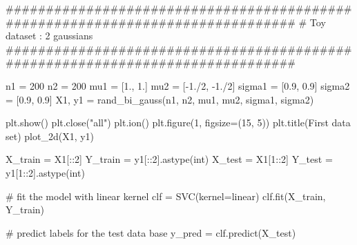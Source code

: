 \documentclass[
  12pt,
  letterpaper,
  DIV=11,
  numbers=noendperiod]{scrartcl}
\newenvironment{Shaded}{\begin{snugshade}}{\end{snugshade}}
\newcommand{\BuiltInTok}[1]{\textcolor[rgb]{0.00,0.23,0.31}{#1}}
\newcommand{\CommentTok}[1]{\textcolor[rgb]{0.37,0.37,0.37}{#1}}
\newcommand{\DecValTok}[1]{\textcolor[rgb]{0.68,0.00,0.00}{#1}}
\newcommand{\FloatTok}[1]{\textcolor[rgb]{0.68,0.00,0.00}{#1}}
\newcommand{\NormalTok}[1]{\textcolor[rgb]{0.00,0.23,0.31}{#1}}
\newcommand{\OperatorTok}[1]{\textcolor[rgb]{0.37,0.37,0.37}{#1}}
\newcommand{\StringTok}[1]{\textcolor[rgb]{0.13,0.47,0.30}{#1}}
\begin{document}
\begin{Shaded}
\begin{Highlighting}[]
\CommentTok{\#\#\#\#\#\#\#\#\#\#\#\#\#\#\#\#\#\#\#\#\#\#\#\#\#\#\#\#\#\#\#\#\#\#\#\#\#\#\#\#\#\#\#\#\#\#\#\#\#\#\#\#\#\#\#\#\#\#\#\#\#\#\#\#\#\#\#\#\#\#\#\#\#\#\#\#\#\#\#}
\CommentTok{\#               Toy dataset : 2 gaussians}
\CommentTok{\#\#\#\#\#\#\#\#\#\#\#\#\#\#\#\#\#\#\#\#\#\#\#\#\#\#\#\#\#\#\#\#\#\#\#\#\#\#\#\#\#\#\#\#\#\#\#\#\#\#\#\#\#\#\#\#\#\#\#\#\#\#\#\#\#\#\#\#\#\#\#\#\#\#\#\#\#\#\#}

\NormalTok{n1 }\OperatorTok{=} \DecValTok{200}
\NormalTok{n2 }\OperatorTok{=} \DecValTok{200}
\NormalTok{mu1 }\OperatorTok{=}\NormalTok{ [}\FloatTok{1.}\NormalTok{, }\FloatTok{1.}\NormalTok{]}
\NormalTok{mu2 }\OperatorTok{=}\NormalTok{ [}\OperatorTok{{-}}\FloatTok{1.}\OperatorTok{/}\DecValTok{2}\NormalTok{, }\OperatorTok{{-}}\FloatTok{1.}\OperatorTok{/}\DecValTok{2}\NormalTok{]}
\NormalTok{sigma1 }\OperatorTok{=}\NormalTok{ [}\FloatTok{0.9}\NormalTok{, }\FloatTok{0.9}\NormalTok{]}
\NormalTok{sigma2 }\OperatorTok{=}\NormalTok{ [}\FloatTok{0.9}\NormalTok{, }\FloatTok{0.9}\NormalTok{]}
\NormalTok{X1, y1 }\OperatorTok{=}\NormalTok{ rand\_bi\_gauss(n1, n2, mu1, mu2, sigma1, sigma2)}

\NormalTok{plt.show()}
\NormalTok{plt.close(}\StringTok{"all"}\NormalTok{)}
\NormalTok{plt.ion()}
\NormalTok{plt.figure(}\DecValTok{1}\NormalTok{, figsize}\OperatorTok{=}\NormalTok{(}\DecValTok{15}\NormalTok{, }\DecValTok{5}\NormalTok{))}
\NormalTok{plt.title(}\StringTok{\textquotesingle{}First data set\textquotesingle{}}\NormalTok{)}
\NormalTok{plot\_2d(X1, y1)}

\NormalTok{X\_train }\OperatorTok{=}\NormalTok{ X1[::}\DecValTok{2}\NormalTok{]}
\NormalTok{Y\_train }\OperatorTok{=}\NormalTok{ y1[::}\DecValTok{2}\NormalTok{].astype(}\BuiltInTok{int}\NormalTok{)}
\NormalTok{X\_test }\OperatorTok{=}\NormalTok{ X1[}\DecValTok{1}\NormalTok{::}\DecValTok{2}\NormalTok{]}
\NormalTok{Y\_test }\OperatorTok{=}\NormalTok{ y1[}\DecValTok{1}\NormalTok{::}\DecValTok{2}\NormalTok{].astype(}\BuiltInTok{int}\NormalTok{)}

\CommentTok{\# fit the model with linear kernel}
\NormalTok{clf }\OperatorTok{=}\NormalTok{ SVC(kernel}\OperatorTok{=}\StringTok{\textquotesingle{}linear\textquotesingle{}}\NormalTok{)}
\NormalTok{clf.fit(X\_train, Y\_train)}

\CommentTok{\# predict labels for the test data base}
\NormalTok{y\_pred }\OperatorTok{=}\NormalTok{ clf.predict(X\_test)}


\end{Highlighting}
\end{Shaded}
\end{document}
